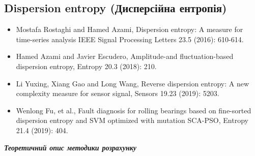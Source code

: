 \documentclass[
  letterpaper,
]{report}
\providecommand{\tightlist}{%
  \setlength{\itemsep}{0pt}\setlength{\parskip}{0pt}}\usepackage{longtable,booktabs,array}
\begin{document}
\hypertarget{dispersion-entropy-ux434ux438ux441ux43fux435ux440ux441ux456ux439ux43dux430-ux435ux43dux442ux440ux43eux43fux456ux44f}{%
\subsection{Dispersion entropy (Дисперсійна
ентропія)}\label{dispersion-entropy-ux434ux438ux441ux43fux435ux440ux441ux456ux439ux43dux430-ux435ux43dux442ux440ux43eux43fux456ux44f}}

\begin{itemize}
\tightlist
\item
  Mostafa Rostaghi and Hamed Azami, Dispersion entropy: A measure for
  time-series analysis IEEE Signal Processing Letters 23.5 (2016):
  610-614.
\item
  Hamed Azami and Javier Escudero, Amplitude-and ﬂuctuation-based
  dispersion entropy, Entropy 20.3 (2018): 210.
\item
  Li Yuxing, Xiang Gao and Long Wang, Reverse dispersion entropy: A new
  complexity measure for sensor signal, Sensors 19.23 (2019): 5203.
\item
  Wenlong Fu, et al., Fault diagnosis for rolling bearings based on
  ﬁne-sorted dispersion entropy and SVM optimized with mutation SCA-PSO,
  Entropy 21.4 (2019): 404.
\end{itemize}

\textbf{\emph{Теоретичний опис методики розрахунку}}
\end{document}

